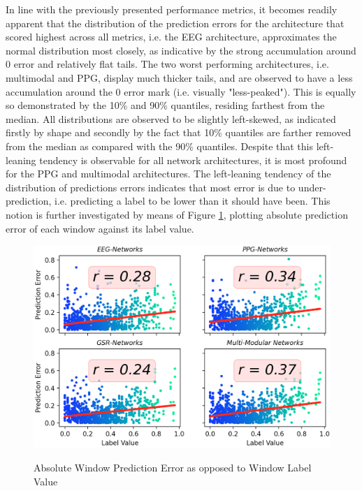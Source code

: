 \documentclass[12pt]{article}
\begin{document}
In line with the previously presented performance metrics, it becomes readily apparent that the distribution of the prediction errors for the architecture that scored highest across all metrics, i.e. the EEG architecture, approximates the normal distribution most closely, as indicative by the strong accumulation around 0 error and relatively flat tails. The two worst performing architectures, i.e. multimodal and PPG, display much thicker tails, and are observed to have a less accumulation around the 0 error mark (i.e. visually "less-peaked"). This is equally so demonstrated by the 10\% and 90\% quantiles, residing farthest from the median.  All distributions are observed to be slightly left-skewed, as indicated firstly by shape and secondly by the fact that 10\% quantiles are farther removed from the median as compared with the 90\% quantiles. Despite that this left-leaning tendency is observable for all network architectures, it is most profound for the PPG and multimodal architectures. The left-leaning tendency of the distribution of predictions errors indicates that most error is due to under-prediction, i.e. predicting a label to be lower than it should have been.  This notion is further investigated by means of Figure \ref{fig:mae_scatter}, plotting absolute prediction error of each window against its label value.

\vspace{0.2cm}
\begin{figure}[h]
\caption{Absolute Window Prediction Error as opposed to Window Label Value}
\includegraphics[scale=0.51]{mae_scatter.png}
\label{fig:mae_scatter}
\end{figure}
\end{document}
